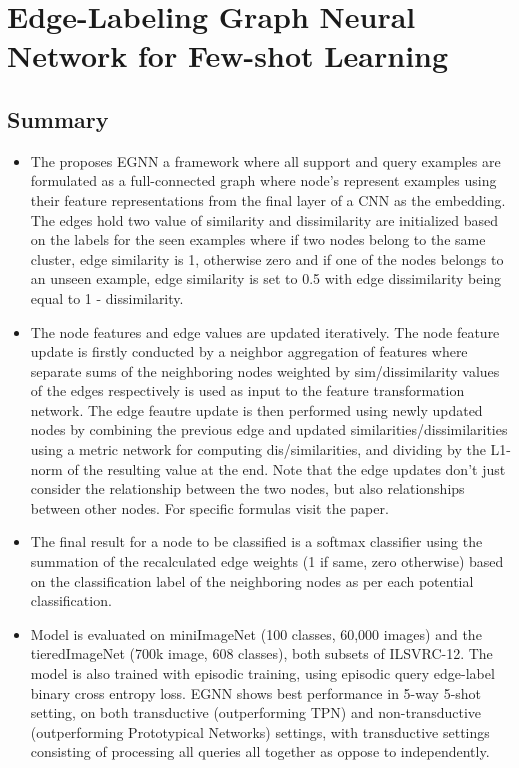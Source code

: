 \documentclass{article}
\begin{document}
\section{Edge-Labeling Graph Neural Network for Few-shot Learning\cite{garcia2018fewshot}}

\subsection{Summary}
\begin{itemize}
    \item The proposes EGNN a framework where all support and query examples are formulated as a full-connected graph where node's represent examples using their feature representations from the final layer of a CNN as the embedding. The edges hold two value of similarity and dissimilarity are initialized based on the labels for the seen examples where if two nodes belong to the same cluster, edge similarity is 1, otherwise zero and if one of the nodes belongs to an unseen example, edge similarity is set to 0.5 with edge dissimilarity being equal to 1 - dissimilarity.
    \item The node features and edge values are updated iteratively. The node feature update is firstly conducted by a neighbor aggregation of features where separate sums of the neighboring nodes weighted by sim/dissimilarity values of the edges respectively is used as input to the feature transformation network. The edge feautre update is then performed using newly updated nodes by combining the previous edge and updated similarities/dissimilarities using a metric network for computing dis/similarities, and dividing by the L1-norm of the resulting value at the end. Note that the edge updates don't just consider the relationship between the two nodes, but also relationships between other nodes. For specific formulas visit the paper. 
    \item The final result for a node to be classified is a softmax classifier using the summation of the recalculated edge weights (1 if same, zero otherwise) based on the classification label of the neighboring nodes as per each potential classification.
    \item Model is evaluated on miniImageNet (100 classes, 60,000 images) and the tieredImageNet (700k image, 608 classes), both subsets of ILSVRC-12. The model is also trained with episodic training, using episodic query edge-label binary cross entropy loss. EGNN shows best performance in 5-way 5-shot setting, on both transductive (outperforming TPN) and non-transductive (outperforming Prototypical Networks) settings, with transductive settings consisting of processing all queries all together as oppose to independently.

\end{itemize}
\end{document}
